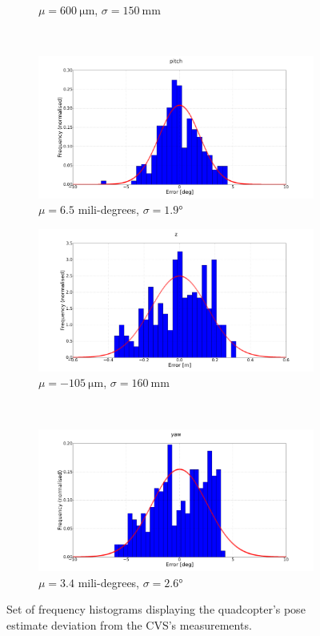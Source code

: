 \begin{figure}
\begin{subfigure}{0.48\textwidth}
    \caption{$\mu = \SI{600}{\micro \m}$, $\sigma = \SI{150}{\mm}$}
  \end{subfigure}
  ~
  \begin{subfigure}{0.48\textwidth}
    \includegraphics[width=\textwidth, clip, trim = 100 20 100 20]{figures/chapter5/err_pitch}
    \caption{$\mu = 6.5$ mili-degrees, $\sigma = \ang{1.9}$}
  \end{subfigure}
  \begin{subfigure}{0.48\textwidth}
    \includegraphics[width=\textwidth, clip, trim = 100 20 100 20]{figures/chapter5/err_z}
    \caption{$\mu = \SI{-105}{\micro \m}$, $\sigma = \SI{160}{\mm}$}
  \end{subfigure}
  ~
  \begin{subfigure}{0.48\textwidth}
    \includegraphics[width=\textwidth, clip, trim = 100 20 100 20]{figures/chapter5/err_yaw}
    \caption{$\mu = 3.4$ mili-degrees, $\sigma = \ang{2.6}$}
  \end{subfigure}
  \caption{Set of frequency histograms displaying the quadcopter's pose estimate deviation from the CVS's measurements.}
\label{fig:chap5-err-hist}
\end{figure}

